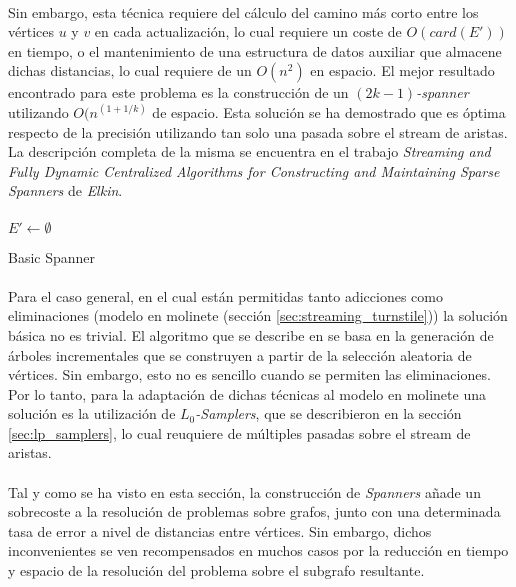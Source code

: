 \documentclass{subfiles}
\begin{document}
        \paragraph{}
        Sin embargo, esta técnica requiere del cálculo del camino más corto entre los vértices $u$ y $v$ en cada actualización, lo cual requiere un coste de $O(card(E'))$ en tiempo, o el mantenimiento de una estructura de datos auxiliar que almacene dichas distancias, lo cual requiere de un $O(n^2)$ en espacio. El mejor resultado encontrado para este problema es la construcción de un \emph{$(2k-1)$-spanner} utilizando $O(n^(1+1/k)$ de espacio. Esta solución se ha demostrado que es óptima respecto de la precisión utilizando tan solo una pasada sobre el stream de aristas. La descripción completa de la misma se encuentra en el trabajo \emph{Streaming and Fully Dynamic Centralized Algorithms for Constructing and Maintaining Sparse Spanners} \cite{elkin2007streaming} de \emph{Elkin}.

        \paragraph{}
        \begin{algorithm}
          \SetAlgoLined
          $E' \gets \emptyset$\;
          \caption{Basic Spanner}
          \label{code:basic_spanner}
        \end{algorithm}

        \paragraph{}
        Para el caso general, en el cual están permitidas tanto adicciones como eliminaciones (modelo en molinete (sección \ref{sec:streaming_turnstile})) la solución básica no es trivial. El algoritmo que se describe en \cite{elkin2007streaming} se basa en la generación de árboles incrementales que se construyen a partir de la selección aleatoria de vértices. Sin embargo, esto no es sencillo cuando se permiten las eliminaciones. Por lo tanto, para la adaptación de dichas técnicas al modelo en molinete una solución es la utilización de \emph{$L_0$-Samplers}, que se describieron en la sección \ref{sec:lp_samplers}, lo cual reuquiere de múltiples pasadas sobre el stream de aristas.

        \paragraph{}
        Tal y como se ha visto en esta sección, la construcción de \emph{Spanners} añade un sobrecoste a la resolución de problemas sobre grafos, junto con una determinada tasa de error a nivel de distancias entre vértices. Sin embargo, dichos inconvenientes se ven recompensados en muchos casos por la reducción en tiempo y espacio de la resolución del problema sobre el subgrafo resultante.
\end{document}
